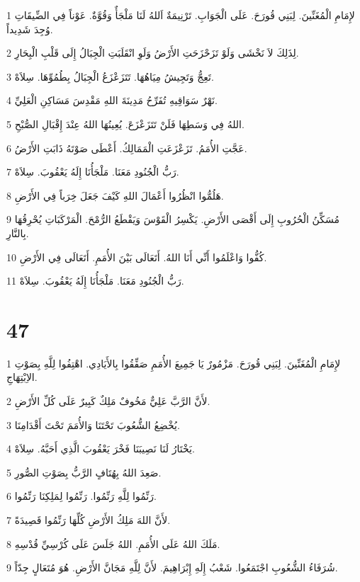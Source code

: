 \par 1 لإِمَامِ الْمُغَنِّينَ. لِبَنِي قُورَحَ. عَلَى الْجَوَابِ. تَرْنِيمَةٌ اَللهُ لَنَا مَلْجَأٌ وَقُوَّةٌ. عَوْناً فِي الضِّيقَاتِ وُجِدَ شَدِيداً.
\par 2 لِذَلِكَ لاَ نَخْشَى وَلَوْ تَزَحْزَحَتِ الأَرْضُ وَلَوِ انْقَلَبَتِ الْجِبَالُ إِلَى قَلْبِ الْبِحَارِ.
\par 3 تَعِجُّ وَتَجِيشُ مِيَاهُهَا. تَتَزَعْزَعُ الْجِبَالُ بِطُمُوِّهَا. سِلاَهْ.
\par 4 نَهْرٌ سَوَاقِيهِ تُفَرِّحُ مَدِينَةَ اللهِ مَقْدِسَ مَسَاكِنِ الْعَلِيِّ.
\par 5 اللهُ فِي وَسَطِهَا فَلَنْ تَتَزَعْزَعَ. يُعِينُهَا اللهُ عِنْدَ إِقْبَالِ الصُّبْحِ.
\par 6 عَجَّتِ الأُمَمُ. تَزَعْزَعَتِ الْمَمَالِكُ. أَعْطَى صَوْتَهُ ذَابَتِ الأَرْضُ.
\par 7 رَبُّ الْجُنُودِ مَعَنَا. مَلْجَأُنَا إِلَهُ يَعْقُوبَ. سِلاَهْ.
\par 8 هَلُمُّوا انْظُرُوا أَعْمَالَ اللهِ كَيْفَ جَعَلَ خِرَباً فِي الأَرْضِ.
\par 9 مُسَكِّنُ الْحُرُوبِ إِلَى أَقْصَى الأَرْضِ. يَكْسِرُ الْقَوْسَ وَيَقْطَعُ الرُّمْحَ. الْمَرْكَبَاتِ يُحْرِقُهَا بِالنَّارِ.
\par 10 كُفُّوا وَاعْلَمُوا أَنِّي أَنَا اللهُ. أَتَعَالَى بَيْنَ الأُمَمِ. أَتَعَالَى فِي الأَرْضِ.
\par 11 رَبُّ الْجُنُودِ مَعَنَا. مَلْجَأُنَا إِلَهُ يَعْقُوبَ. سِلاَهْ.

\chapter{47}

\par 1 لإِمَامِ الْمُغَنِّينَ. لِبَنِي قُورَحَ. مَزْمُورٌ يَا جَمِيعَ الأُمَمِ صَفِّقُوا بِالأَيَادِي. اهْتِفُوا لِلَّهِ بِصَوْتِ الاِبْتِهَاجِ.
\par 2 لأَنَّ الرَّبَّ عَلِيٌّ مَخُوفٌ مَلِكٌ كَبِيرٌ عَلَى كُلِّ الأَرْضِ.
\par 3 يُخْضِعُ الشُّعُوبَ تَحْتَنَا وَالأُمَمَ تَحْتَ أَقْدَامِنَا.
\par 4 يَخْتَارُ لَنَا نَصِيبَنَا فَخْرَ يَعْقُوبَ الَّذِي أَحَبَّهُ. سِلاَهْ.
\par 5 صَعِدَ اللهُ بِهُتَافٍ الرَّبُّ بِصَوْتِ الصُّورِ.
\par 6 رَنِّمُوا لِلَّهِ رَنِّمُوا. رَنِّمُوا لِمَلِكِنَا رَنِّمُوا.
\par 7 لأَنَّ اللهَ مَلِكُ الأَرْضِ كُلِّهَا رَنِّمُوا قَصِيدَةً.
\par 8 مَلَكَ اللهُ عَلَى الأُمَمِ. اللهُ جَلَسَ عَلَى كُرْسِيِّ قُدْسِهِ.
\par 9 شُرَفَاءُ الشُّعُوبِ اجْتَمَعُوا. شَعْبُ إِلَهِ إِبْرَاهِيمَ. لأَنَّ لِلَّهِ مَجَانَّ الأَرْضِ. هُوَ مُتَعَالٍ جِدّاً.

